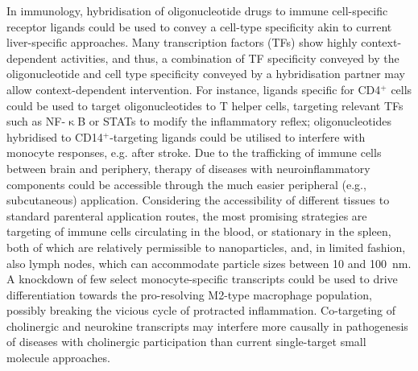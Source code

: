 In immunology, hybridisation of oligonucleotide drugs to immune cell-specific receptor ligands could be used to convey a cell-type specificity akin to current liver-specific approaches. Many transcription factors (TFs) show highly context-dependent activities,\cite{Hamada2020} and thus, a combination of TF specificity conveyed by the oligonucleotide and cell type specificity conveyed by a hybridisation partner may allow context-dependent intervention. For instance, ligands specific for CD4$^+$ cells could be used to target oligonucleotides to T helper cells, targeting relevant TFs such as NF-$\upkappa$B or STATs to modify the inflammatory reflex; oligonucleotides hybridised to CD14$^+$-targeting ligands could be utilised to interfere with monocyte responses, e.g. after stroke. Due to the trafficking of immune cells between brain and periphery, therapy of diseases with neuroinflammatory components could be accessible through the much easier peripheral (e.g., subcutaneous) application. Considering the accessibility of different tissues to standard parenteral application routes, the most promising strategies are targeting of immune cells circulating in the blood, or stationary in the spleen, both of which are relatively permissible to nanoparticles,\cite{Gullotti2009} and, in limited fashion, also lymph nodes, which can accommodate particle sizes between 10 and \SI{100}{\nano\metre}.\cite{Schudel2019} A knockdown of few select monocyte-specific transcripts could be used to drive differentiation towards the pro-resolving M2-type macrophage population,\cite{Panizzi2010} possibly breaking the vicious cycle of protracted inflammation. Co-targeting of cholinergic and neurokine transcripts may interfere more causally in pathogenesis of diseases with cholinergic participation than current single-target small molecule approaches.

